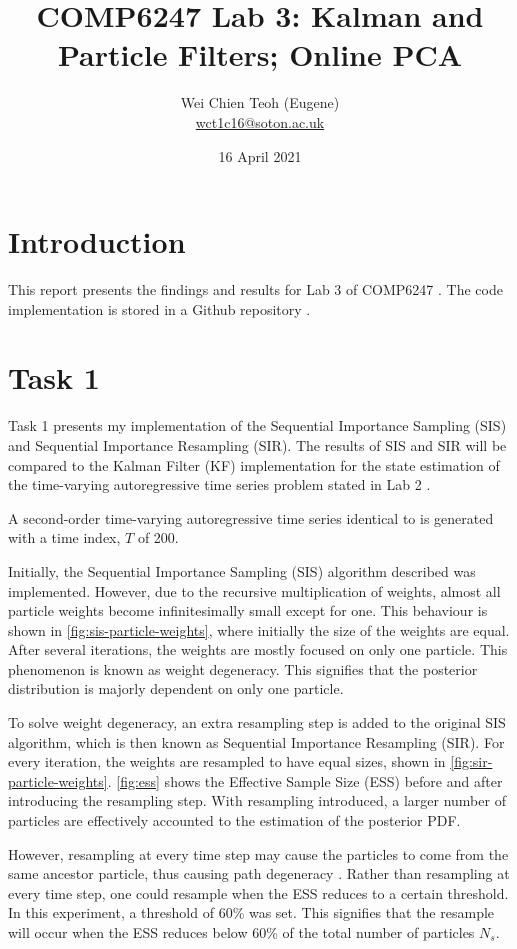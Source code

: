 \documentclass{article}
\title{COMP6247 Lab 3: Kalman and Particle Filters; Online PCA}
\author{Wei Chien Teoh (Eugene)\\\bigskip \href{mailto:wct1c16@soton.ac.uk}{wct1c16@soton.ac.uk}}
\date{16 April 2021}
\begin{document}
\maketitle

\section{Introduction}

This report presents the findings and results for Lab 3 of COMP6247 \cite{lab3}. The code implementation is stored in a Github repository \cite{github}.

\section{Task 1} \label{sec:task-1}

Task 1 presents my implementation of the Sequential Importance Sampling (SIS) and Sequential Importance Resampling (SIR). The results of SIS and SIR will be compared to the Kalman Filter (KF) implementation \cite{lab2ans} for the state estimation of the time-varying autoregressive time series problem stated in Lab 2 \cite{lab2}.

A second-order time-varying autoregressive time series identical to \cite{lab2} is generated with a time index, $T$ of 200.

Initially, the Sequential Importance Sampling (SIS) algorithm described \cite{particle_filters} was implemented. However, due to the recursive multiplication of weights, almost all particle weights become infinitesimally small except for one. This behaviour is shown in \cref{fig:sis-particle-weights}, where initially the size of the weights are equal. After several iterations, the weights are mostly focused on only one particle. This phenomenon is known as weight degeneracy. This signifies that the posterior distribution is majorly dependent on only one particle.

To solve weight degeneracy, an extra resampling step \cite{particle_filters} is added to the original SIS algorithm, which is then known as Sequential Importance Resampling (SIR). For every iteration, the weights are resampled to have equal sizes, shown in \cref{fig:sir-particle-weights}. \cref{fig:ess} shows the Effective Sample Size (ESS) before and after introducing the resampling step. With resampling introduced, a larger number of particles are effectively accounted to the estimation of the posterior PDF.

However, resampling at every time step may cause the particles to come from the same ancestor particle, thus causing path degeneracy \cite{lecture6}. Rather than resampling at every time step, one could resample when the ESS reduces to a certain threshold. In this experiment, a threshold of 60\% was set. This signifies that the resample will occur when the ESS reduces below 60\% of the total number of particles $N_s$.
\end{document}
